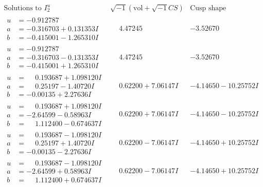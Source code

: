 \documentclass[1p]{elsarticle_modified}
\theoremstyle{definition}
\newcommand{\I}{\sqrt{-1}}
\begin{document}
$$\begin{array}{c|c|c}  
\text{Solutions to }I^u_{2}& \I (\text{vol} + \sqrt{-1}CS) & \text{Cusp shape}\\
 \hline 
\begin{aligned}
u &= -0.912787\phantom{ +0.000000I} \\
a &= -0.316703 + 0.131353 I \\
b &= -0.415001 - 1.265310 I\end{aligned}
 & \phantom{-}4.47245\phantom{ +0.000000I} & -3.52670\phantom{ +0.000000I} \\ \hline\begin{aligned}
u &= -0.912787\phantom{ +0.000000I} \\
a &= -0.316703 - 0.131353 I \\
b &= -0.415001 + 1.265310 I\end{aligned}
 & \phantom{-}4.47245\phantom{ +0.000000I} & -3.52670\phantom{ +0.000000I} \\ \hline\begin{aligned}
u &= \phantom{-}0.193687 + 1.098120 I \\
a &= \phantom{-}0.25197 - 1.40720 I \\
b &= -0.00135 + 2.27636 I\end{aligned}
 & \phantom{-}0.62200 + 7.06147 I & -4.14650 - 10.25752 I \\ \hline\begin{aligned}
u &= \phantom{-}0.193687 + 1.098120 I \\
a &= -2.64599 - 0.58963 I \\
b &= \phantom{-}1.112400 - 0.674637 I\end{aligned}
 & \phantom{-}0.62200 + 7.06147 I & -4.14650 - 10.25752 I \\ \hline\begin{aligned}
u &= \phantom{-}0.193687 - 1.098120 I \\
a &= \phantom{-}0.25197 + 1.40720 I \\
b &= -0.00135 - 2.27636 I\end{aligned}
 & \phantom{-}0.62200 - 7.06147 I & -4.14650 + 10.25752 I \\ \hline\begin{aligned}
u &= \phantom{-}0.193687 - 1.098120 I \\
a &= -2.64599 + 0.58963 I \\
b &= \phantom{-}1.112400 + 0.674637 I\end{aligned}
 & \phantom{-}0.62200 - 7.06147 I & -4.14650 + 10.25752 I \\ \hline\begin{aligned}

\end{aligned}
\end{array}$$
\end{document}
